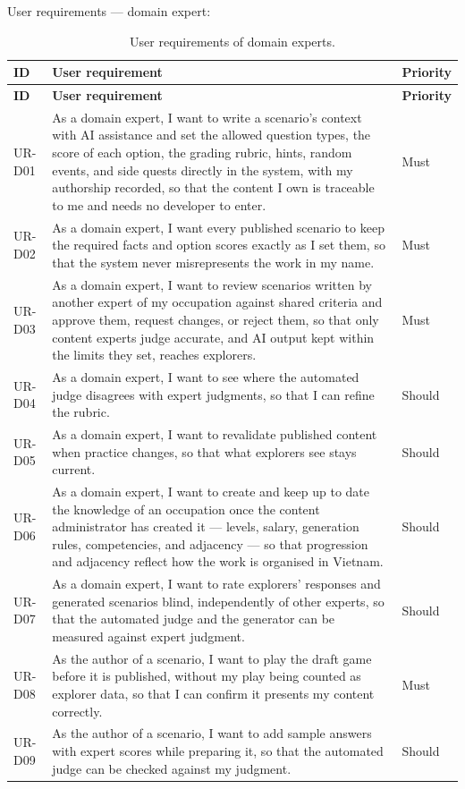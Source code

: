User requirements --- domain expert:

{\small
\begin{longtable}{|>{\raggedright\arraybackslash}p{}|>{\raggedright\arraybackslash}p{}|>{\raggedright\arraybackslash}p{}|}
\caption{User requirements of domain experts.} \\
\hline
\textbf{ID} & \textbf{User requirement} & \textbf{Priority} \\ \hline
\endfirsthead
\hline
\textbf{ID} & \textbf{User requirement} & \textbf{Priority} \\ \hline
\endhead
UR-D01 & As a domain expert, I want to write a scenario's context with AI assistance and set the allowed question types, the score of each option, the grading rubric, hints, random events, and side quests directly in the system, with my authorship recorded, so that the content I own is traceable to me and needs no developer to enter. & Must \\ \hline
UR-D02 & As a domain expert, I want every published scenario to keep the required facts and option scores exactly as I set them, so that the system never misrepresents the work in my name. & Must \\ \hline
UR-D03 & As a domain expert, I want to review scenarios written by another expert of my occupation against shared criteria and approve them, request changes, or reject them, so that only content experts judge accurate, and AI output kept within the limits they set, reaches explorers. & Must \\ \hline
UR-D04 & As a domain expert, I want to see where the automated judge disagrees with expert judgments, so that I can refine the rubric. & Should \\ \hline
UR-D05 & As a domain expert, I want to revalidate published content when practice changes, so that what explorers see stays current. & Should \\ \hline
UR-D06 & As a domain expert, I want to create and keep up to date the knowledge of an occupation once the content administrator has created it --- levels, salary, generation rules, competencies, and adjacency --- so that progression and adjacency reflect how the work is organised in Vietnam. & Should \\ \hline
UR-D07 & As a domain expert, I want to rate explorers' responses and generated scenarios blind, independently of other experts, so that the automated judge and the generator can be measured against expert judgment. & Should \\ \hline
UR-D08 & As the author of a scenario, I want to play the draft game before it is published, without my play being counted as explorer data, so that I can confirm it presents my content correctly. & Must \\ \hline
UR-D09 & As the author of a scenario, I want to add sample answers with expert scores while preparing it, so that the automated judge can be checked against my judgment. & Should \\ \hline
\end{longtable}
}

